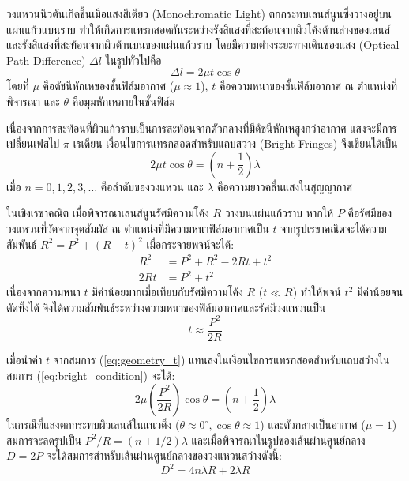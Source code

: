 \documentclass[11pt,a4paper]{article}
\begin{document}
วงแหวนนิวตันเกิดขึ้นเมื่อแสงสีเดียว (Monochromatic Light) \cite{Hecht,Jenkins} ตกกระทบเลนส์นูนซึ่งวางอยู่บนแผ่นแก้วแบนราบ ทำให้เกิดการแทรกสอดกันระหว่างรังสีแสงที่สะท้อนจากผิวโค้งด้านล่างของเลนส์และรังสีแสงที่สะท้อนจากผิวด้านบนของแผ่นแก้วราบ โดยมีความต่างระยะทางเดินของแสง (Optical Path Difference) $\Delta l$ ในรูปทั่วไปคือ \cite{Hecht}
\begin{equation}
    \Delta l = 2\mu t \cos \theta  \label{eq:basic}
\end{equation} 
โดยที่ $\mu$ คือดัชนีหักเหของชั้นฟิล์มอากาศ ($\mu \approx 1$), $t$ คือความหนาของชั้นฟิล์มอากาศ ณ ตำแหน่งที่พิจารณา และ $\theta$ คือมุมหักเหภายในชั้นฟิล์ม

เนื่องจากการสะท้อนที่ผิวแก้วราบเป็นการสะท้อนจากตัวกลางที่มีดัชนีหักเหสูงกว่าอากาศ แสงจะมีการเปลี่ยนเฟสไป $\pi$ เรเดียน เงื่อนไขการแทรกสอดสำหรับแถบสว่าง (Bright Fringes) จึงเขียนได้เป็น
\begin{equation}
    2\mu t \cos \theta = \left(n + \frac{1}{2}\right)\lambda \label{eq:bright_condition}
\end{equation}
เมื่อ $n = 0, 1, 2, 3, \dots$ คือลำดับของวงแหวน และ $\lambda$ คือความยาวคลื่นแสงในสุญญากาศ

ในเชิงเรขาคณิต เมื่อพิจารณาเลนส์นูนรัศมีความโค้ง $R$ วางบนแผ่นแก้วราบ หากให้ $P$ คือรัศมีของวงแหวนที่วัดจากจุดสัมผัส ณ ตำแหน่งที่มีความหนาฟิล์มอากาศเป็น $t$ จากรูปเรขาคณิตจะได้ความสัมพันธ์ $R^2 = P^2 + (R-t)^2$ เมื่อกระจายพจน์จะได้:
\begin{align*}
    R^2 &= P^2 + R^2 - 2Rt + t^2 \\
    2Rt &= P^2 + t^2
\end{align*}
เนื่องจากความหนา $t$ มีค่าน้อยมากเมื่อเทียบกับรัศมีความโค้ง $R$ ($t \ll R$) ทำให้พจน์ $t^2$ มีค่าน้อยจนตัดทิ้งได้ จึงได้ความสัมพันธ์ระหว่างความหนาของฟิล์มอากาศและรัศมีวงแหวนเป็น
\begin{equation}
    t \approx \frac{P^2}{2R} \label{eq:geometry_t}
\end{equation}

เมื่อนำค่า $t$ จากสมการ (\ref{eq:geometry_t}) แทนลงในเงื่อนไขการแทรกสอดสำหรับแถบสว่างในสมการ (\ref{eq:bright_condition}) จะได้:
\begin{equation}
    2\mu \left( \frac{P^2}{2R} \right) \cos \theta = \left(n + \frac{1}{2}\right)\lambda \label{eq: medium}
\end{equation}
ในกรณีที่แสงตกกระทบผิวเลนส์ในแนวดิ่ง ($\theta \approx 0^\circ, \cos \theta \approx 1$) และตัวกลางเป็นอากาศ ($\mu = 1$) สมการจะลดรูปเป็น $P^2 / R = (n + 1/2)\lambda$ และเมื่อพิจารณาในรูปของเส้นผ่านศูนย์กลาง $D = 2P$ จะได้สมการสำหรับเส้นผ่านศูนย์กลางของวงแหวนสว่างดังนี้: \cite{Jenkins}
\begin{equation}
    D^2 = 4n\lambda R + 2\lambda R \label{eq:Diameter square}
\end{equation}
\end{document}
